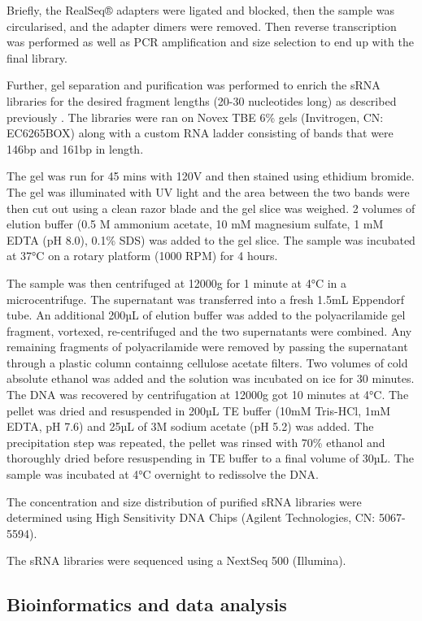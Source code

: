 Briefly, the RealSeq® adapters were ligated and blocked, then the sample was circularised, and the adapter dimers were removed. Then reverse transcription was performed as well as PCR amplification and size selection to end up with the final library.

Further, gel separation  and purification was performed to enrich the sRNA libraries for the desired fragment lengths (20-30 nucleotides long) as described previously \citep{RN187}. The libraries were ran on Novex TBE 6\% gels (Invitrogen, CN: EC6265BOX) along with a custom RNA ladder consisting of bands that were 146bp and 161bp in length. 

The gel was run for 45 mins with 120V and then stained using ethidium bromide. The gel was illuminated with UV light and the area between the two bands were then cut out using a clean razor blade and the gel slice was weighed. 2 volumes of elution buffer (0.5 M ammonium acetate, 10 mM magnesium sulfate, 1 mM EDTA (pH 8.0), 0.1\% SDS) was added to the gel slice. The sample was incubated at 37°C on a rotary platform (1000 RPM) for 4 hours. 

The sample was then centrifuged at 12000g for 1 minute at 4°C in a microcentrifuge. The supernatant was transferred into a fresh 1.5mL Eppendorf tube. An additional 200µL of elution buffer was added to the polyacrilamide gel fragment, vortexed, re-centrifuged and the two supernatants were combined. Any remaining fragments of polyacrilamide were removed  by passing the supernatant through a plastic column containng cellulose acetate filters. Two volumes of cold absolute ethanol was added and the solution was incubated on ice for 30 minutes. The DNA was recovered by centrifugation at 12000g got 10 minutes at 4°C. The pellet was dried and resuspended in 200µL TE buffer (10mM Tris-HCl, 1mM EDTA, pH 7.6) and 25µL of 3M sodium acetate (pH 5.2) was added. The precipitation step was repeated, the pellet was rinsed with 70\% ethanol and thoroughly dried before resuspending in TE buffer to a final volume of 30µL. The sample was incubated at 4°C overnight to redissolve the DNA.

The concentration and size distribution of purified sRNA libraries were determined using  High Sensitivity DNA Chips (Agilent Technologies, CN: 5067-5594).

The sRNA libraries were sequenced using a NextSeq 500 (Illumina).

\subsection{Bioinformatics and data analysis}

